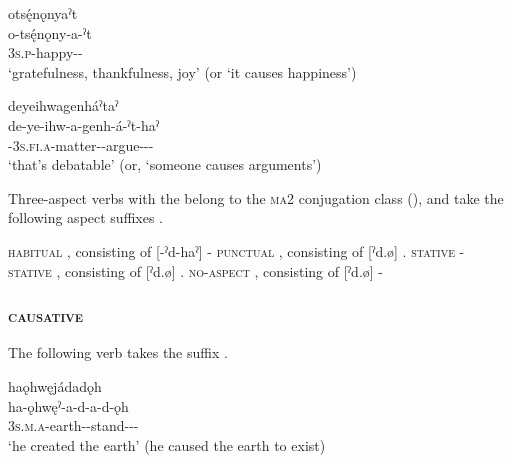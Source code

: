 
\ex otsę́nǫnyaˀt \\
\gll o-tsę́nǫny-a-ˀt\\
\textsc{3s.p}-happy-{\joinerA}-\\
\glt ‘gratefulness, thankfulness, joy’ (or ‘it causes happiness’)

\ex deyeihwagenháˀtaˀ\\
\gll de-ye-ihw-a-genh-á-ˀt-haˀ\\
{\dualic}-\textsc{3s.fi.a}-matter-{\joinerA}-argue-{\joinerA}-{\causative}-{\habitual}\\
\glt ‘that’s debatable’ (or, ‘someone causes arguments’) 

\z
\z

Three-aspect verbs with the  {\causative} belong to the \textsc{ma2} conjugation class (), and take the following aspect suffixes .

\ea\label{ex:causex7}
\ea \textsc{habitual} , consisting of [-ˀd-haˀ] {\causative}-{\habitual}
\ex \textsc{punctual} , consisting of [ˀd.ø] {\causative}.{\zeropunctual}
\ex \textsc{stative}  {\causative}-{\stative}
\ex \textsc{stative} , consisting of [ˀd.ø] {\causative}.{\stative}
\ex \textsc{no-aspect} , consisting of [ˀd.ø] {\causative}-{\noaspect}
\z
\z


\subsubsection{ \textsc{causative}} \label{[-t, -d] (causative)}
The following verb takes the  {\causative} suffix .

\ea\label{ex:causex8}
haǫhwęjádadǫh\\
\gll ha-ǫhwęˀ-a-d-a-d-ǫh \\
\textsc{3s.m.a}-earth-{\joinerA}-stand-{\joinerA}-{\causative}-{\stative}\\
\glt ‘he created the earth’ (he caused the earth to exist)
\citep{foster_course_1993}

